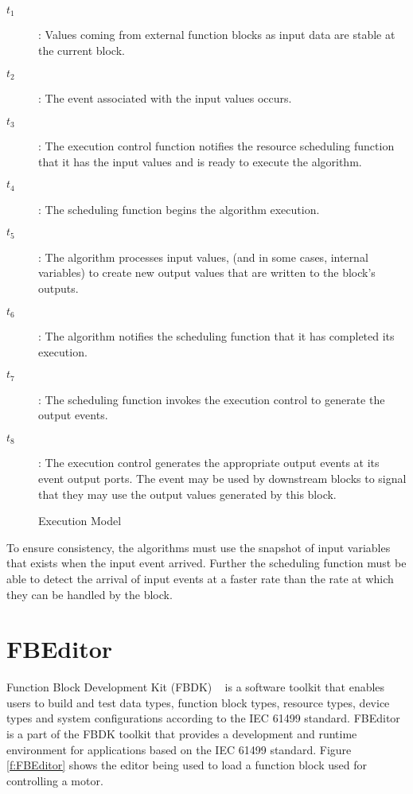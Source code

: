 \begin{description}
\item[$t_1$]: Values coming from external function blocks
as input data are stable at the current block.
\item[$t_2$]: The event associated with the input values occurs.
\item[$t_3$]: The execution control function notifies the resource
scheduling function that it has the input values and is ready to
execute the algorithm.
\item[$t_4$]: The scheduling function begins the algorithm execution.
\item[$t_5$]: The algorithm processes input values, (and in some
cases, internal variables) to create new output values that are
written to the block's outputs.
\item[$t_6$]: The algorithm notifies the scheduling function that it
has completed its execution.
\item[$t_7$]: The scheduling function invokes the execution control
to generate the output events.
\item[$t_8$]: The execution control generates the appropriate output
events at its event output ports. The event may be used by
downstream blocks to signal that they may use the output values
generated by this block.
\end{description}

%
\begin{figure}
\begin{center}
\caption[Execution Model]{Execution Model{\protect
~\cite{iec:61499:2000}}} \label{f:Execution_Model}
\end{center}
\end{figure}
%

To ensure consistency, the algorithms must use the snapshot of
input variables that exists when the input event arrived. Further
the scheduling function must be able to detect the arrival of
input events at a faster rate than the rate at which they can be
handled by the block.

\section{FBEditor}
Function Block Development Kit (FBDK) ~\cite{c:fun:2002} is a
software toolkit that enables users to build and test data types,
function block types, resource types, device types and system
configurations according to the IEC 61499 standard. FBEditor is a
part of the FBDK toolkit that provides a development and runtime
environment for applications based on the IEC 61499 standard.
Figure \ref{f:FBEditor} shows the editor being used to load a
function block used for controlling a motor.

